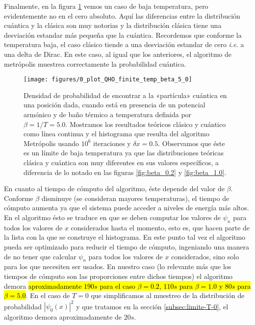 \documentclass[%
 reprint,
 amsmath,amssymb,
 aps,
 pra,
]{revtex4-2}
\begin{document}
Finalmente, en la figura \ref{fig:beta_5.0} vemos un caso de baja temperatura, pero evidentemente no en el cero absoluto. Aquí las diferencias entre la distribución cuántica y la clásica son muy notorias y la distribución clásica tiene una desviación estandar más pequeña que la cuántica. Recordemos que conforme la temperatura baja, el caso clásico tiende a una desviación estandar de cero \textit{i.e.} a una delta de Dirac. En este caso, al igual que los anteriores, el algoritmo de metrópolis muestrea correctamente la probabilidad cuántica. 

\begin{figure}[t]
	\centering
	\texttt{[image: figures/0\_plot\_QHO\_finite\_temp\_beta\_5\_0]}
	\caption{Densidad de probabilidad de encontrar a la «partícula» cuántica en una posición dada, cuando está en presencia de un potencial armónico y de baño térmico a temperatura definida por $\beta=1/T=5.0$. Mostramos los resultados teóricos clásico y cuántico como línea continua y el histograma que resulta del algoritmo Metrópolis usando $10^6$ iteraciones y $\delta x = 0.5$. Observamos que éste es un límite de baja temperatura ya que las distribuciones teóricas clásica y cuántica son muy diferentes en sus valores específicos, a diferencia de lo notado en las figuras \ref{fig:beta_0.2} y \ref{fig:beta_1.0}.}
	\label{fig:beta_5.0}
\end{figure}

En cuanto al tiempo de cómputo del algoritmo, éste depende del valor de $\beta$. Conforme $\beta$ disminuye (se consideran mayores temperaturas), el tiempo de cómputo aumenta ya que el sistema puede acceder a niveles de energía más altos. En el algoritmo ésto se traduce en que se deben computar los valores de $\psi_n$ para todos los valores de $x$ considerados hasta el momento, esto es, que hacen parte de la lista con la que se construye el histograma. En este punto tal vez el algoritmo pueda ser optimizado para reducir el tiempo de cómputo, ingeniando una manera de no tener que calcular $\psi_n$ para todos los valores de $x$ considerados, sino solo para los que necesiten ser usados. En nuestro caso (lo relevante más que los tiempos de cómputo son las proporciones entre dichos tiempos) el algoritmo demora \hl{aproximadamente $190s$ para el caso $\beta = 0.2$, $110s$ para $\beta = 1.0$ y $80s$ para $\beta=5.0$}. En el caso de $T=0$ que simplificamos al muestreo de la distribución de probabilidad $\left|\psi_0(x)\right|^2$ y que tratamos en la sección \ref{subsec:limite-T-0}, el algoritmo demora aproximadamente de $20s$.
\end{document}
